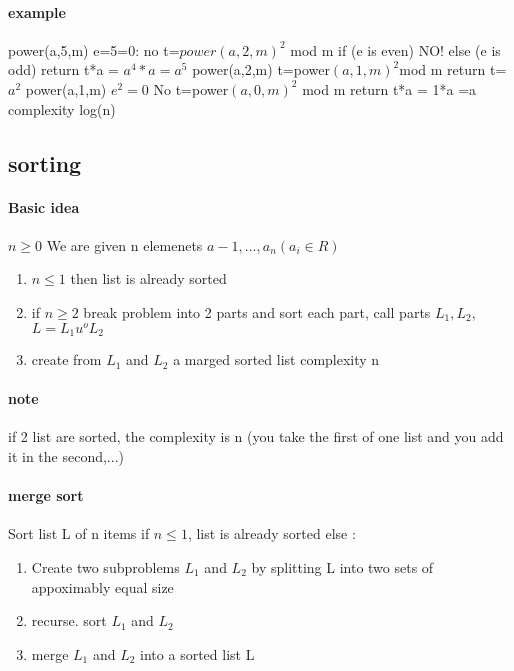 \documentclass[a4paper,10pt]{article}
\begin{document}
\paragraph{example}
power(a,5,m) e=5=0: no t=$power(a,2,m)^2$ mod m
\newline
if (e is even) NO!
\newline
else (e is odd) return t*a = $a^4*a=a^5$
\newline
power(a,2,m)
\newline
t=power$(a,1,m)^2$mod m
\newline
return t=$a^2$
\newline
power(a,1,m)
\newline
$e^2=0$ No
\newline
t=power$(a,0,m)^2$ mod m
\newline
return t*a = 1*a =a
\newline
complexity log(n)
\subsection{sorting}
\paragraph{Basic idea}
$n\geq 0$
\newline
We are given n elemenets $a-1,...,a_n(a_i\in R)$
\begin{enumerate}
 \item $n\leq 1$ then list is already sorted
 \item if $n\geq 2$ break problem into 2 parts and sort each part, call parts $L_1,L_2$, $L=L_1u^oL_2$ 
 \item create from $L_1$ and $L_2$ a marged sorted list complexity n
\end{enumerate}
\paragraph{note}
if 2 list are sorted, the complexity is n (you take the first of one list and you add it in the second,...)
\paragraph{merge sort}
Sort list L of n items if $n\leq 1$, list is already sorted
\newline
else :
\begin{enumerate}
 \item Create two subproblems $L_1$ and $L_2$ by splitting L into two sets of appoximably equal size
 \item recurse. sort $L_1$ and $L_2$
 \item merge $L_1$ and $L_2$ into a sorted list L
\end{enumerate}
\end{document}
